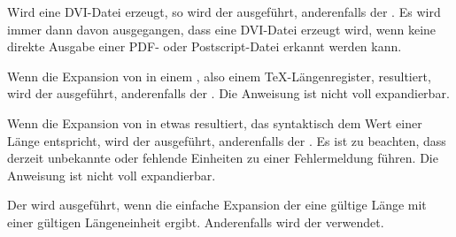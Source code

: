 \begin{Declaration}[0]
\end{Declaration}
Wird eine DVI-Datei erzeugt, so wird der
 ausgeführt, anderenfalls der . Es wird
immer dann davon \iffree{}{\pagebreak}%
ausgegangen, dass eine DVI-Datei erzeugt wird, wenn keine
direkte Ausgabe einer PDF- oder Postscript-Datei erkannt werden kann.%
\EndIndexGroup


\begin{Declaration}
\end{Declaration}
Wenn
die Expansion von  in einem , also einem
\TeX-Längenregister, resultiert, wird der  ausgeführt,
anderenfalls der . Die Anweisung ist nicht voll
expandierbar.%
\iffalse%
\iftrue%
\ Von dieser Anweisung gibt es keine interne Variante.%
\else%
\ Es gibt keine interne Variante.%
\fi%
\fi%
\EndIndexGroup


\begin{Declaration}
\end{Declaration}
Wenn
die Expansion von  in etwas resultiert, das syntaktisch dem Wert
einer Länge entspricht, wird der  ausgeführt, anderenfalls
der . Es ist zu beachten, dass derzeit
unbekannte oder fehlende Einheiten zu einer Fehlermeldung führen. Die
Anweisung ist nicht voll expandierbar.%
\iffalse%
\iftrue%
\ Von dieser Anweisung gibt es keine interne Variante.%
\else%
\ Es gibt keine interne Variante.%
\fi%
\fi%
\EndIndexGroup


\begin{Declaration}
\end{Declaration}
Der
 wird ausgeführt, wenn die einfache Expansion der
 eine gültige Länge mit einer gültigen Längeneinheit
ergibt. Anderenfalls wird der  verwendet.%
\iffalse%
\iftrue%
\ Von dieser Anweisung gibt es keine interne Variante.%
\else%
\ Es gibt keine interne Variante.%
\fi%
\fi%
\EndIndexGroup


